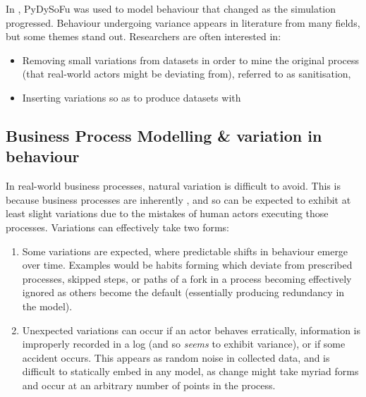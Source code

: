 In \cite{wallis2018caise}, PyDySoFu was used to model behaviour that changed as
the simulation progressed. Behaviour undergoing variance appears in literature
from many fields, but some themes stand out. Researchers are often interested
in:

\begin{itemize}
    \item Removing small variations from datasets in order to mine the original
    process (that real-world actors might be deviating from), referred to as
    sanitisation,
    \item Inserting variations so as to produce datasets with 
\end{itemize}

\subsection{Business Process Modelling \& variation in behaviour}

In real-world business processes, natural variation is difficult to avoid. This
is because business processes are inherently \sociotechnical, and so can be
expected to exhibit at least slight variations due to the mistakes of human
actors executing those processes. Variations can effectively take two forms:

\begin{enumerate}
    \item Some variations are expected, where predictable shifts in behaviour
    emerge over time. Examples would be habits forming which deviate from
    prescribed processes, skipped steps, or paths of a fork in a process
    becoming effectively ignored as others become the default (essentially
    producing redundancy in the model).
    \item Unexpected variations can occur if an actor behaves erratically,
    information is improperly recorded in a log (and so \emph{seems} to exhibit
    variance), or if some accident occurs. This appears as random noise in
    collected data, and is difficult to statically embed in any model, as change
    might take myriad forms and occur at an arbitrary number of points in the
    process.
\end{enumerate}

